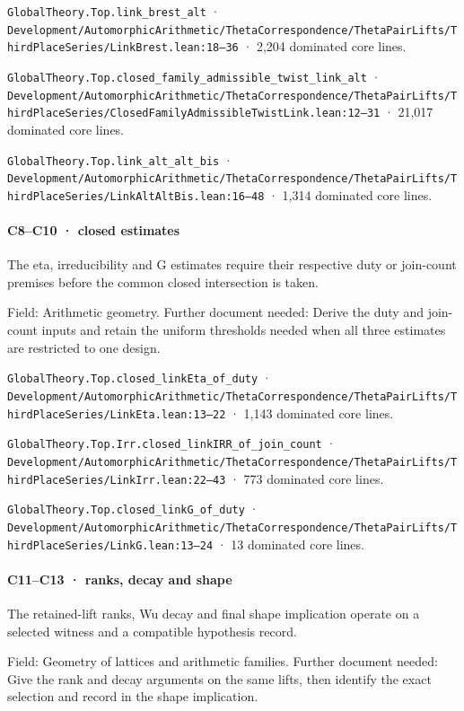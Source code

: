 \nolinkurl{GlobalTheory.Top.link_brest_alt} · \nolinkurl{Development/AutomorphicArithmetic/ThetaCorrespondence/ThetaPairLifts/ThirdPlaceSeries/LinkBrest.lean:18–36} · 2,204 dominated core lines.

\nolinkurl{GlobalTheory.Top.closed_family_admissible_twist_link_alt} · \nolinkurl{Development/AutomorphicArithmetic/ThetaCorrespondence/ThetaPairLifts/ThirdPlaceSeries/ClosedFamilyAdmissibleTwistLink.lean:12–31} · 21,017 dominated core lines.

\nolinkurl{GlobalTheory.Top.link_alt_alt_bis} · \nolinkurl{Development/AutomorphicArithmetic/ThetaCorrespondence/ThetaPairLifts/ThirdPlaceSeries/LinkAltAltBis.lean:16–48} · 1,314 dominated core lines.

\paragraph{C8–C10 · closed estimates}

The eta, irreducibility and G estimates require their respective duty or join-count premises before the common closed intersection is taken.

Field: Arithmetic geometry. Further document needed: Derive the duty and join-count inputs and retain the uniform thresholds needed when all three estimates are restricted to one design.

\nolinkurl{GlobalTheory.Top.closed_linkEta_of_duty} · \nolinkurl{Development/AutomorphicArithmetic/ThetaCorrespondence/ThetaPairLifts/ThirdPlaceSeries/LinkEta.lean:13–22} · 1,143 dominated core lines.

\nolinkurl{GlobalTheory.Top.Irr.closed_linkIRR_of_join_count} · \nolinkurl{Development/AutomorphicArithmetic/ThetaCorrespondence/ThetaPairLifts/ThirdPlaceSeries/LinkIrr.lean:22–43} · 773 dominated core lines.

\nolinkurl{GlobalTheory.Top.closed_linkG_of_duty} · \nolinkurl{Development/AutomorphicArithmetic/ThetaCorrespondence/ThetaPairLifts/ThirdPlaceSeries/LinkG.lean:13–24} · 13 dominated core lines.

\paragraph{C11–C13 · ranks, decay and shape}

The retained-lift ranks, Wu decay and final shape implication operate on a selected witness and a compatible hypothesis record.

Field: Geometry of lattices and arithmetic families. Further document needed: Give the rank and decay arguments on the same lifts, then identify the exact selection and record in the shape implication.

